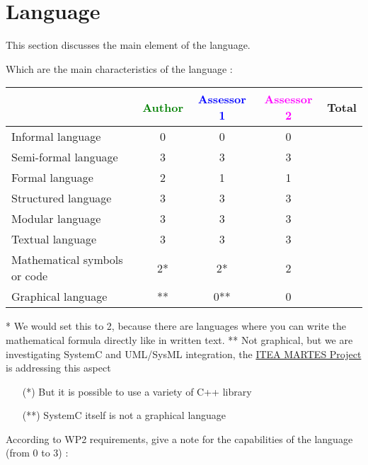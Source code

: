 \section{Language}
This section discusses the main element of the language.

Which are the main characteristics of the language :

\begin{tabular}{|l | c | c | c | c|}
\hline
& \textcolor{green}{Author} & \textcolor{blue}{Assessor 1} & \textcolor{magenta}{Assessor 2} & Total \\
\hline
Informal language &0 & 0 & 0 & \\
\hline
Semi-formal language &3 & 3& 3 & \\
\hline
Formal language &2 &1 & 1 & \\
\hline
Structured language &3 &3 & 3 & \\
\hline
Modular language &3 &3 & 3 & \\
\hline
Textual language &3 &3 & 3 & \\
\hline
Mathematical symbols or code &2* &2* & 2 & \\
\hline
Graphical language &** & 0**& 0 & \\
\hline
\end{tabular}

\begin{author_comment}
* We would set this to 2, because there are languages where you can write the mathematical formula directly like in written text.
** Not graphical, but we are investigating SystemC and UML/SysML integration, the \href{http://www.martes-idea.org/}{ITEA MARTES Project} is addressing this aspect
\end{author_comment}
\begin{assessor1}
\begin{itemize}
\item[(*)] But it is possible to use a variety of C++ library
\item[(**)] SystemC itself is not a graphical language
\end{itemize}
\end{assessor1}

According to WP2 requirements, give a note for the capabilities of the language (from 0 to 3) :

